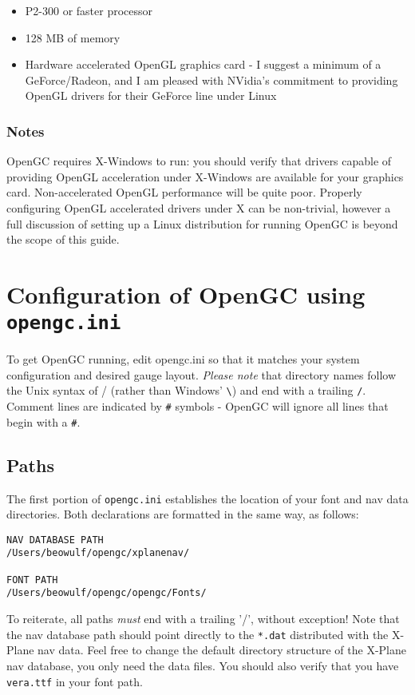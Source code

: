 \documentclass[11pt]{article}
\begin{document}
\begin{itemize}
\item P2-300 or faster processor
\item 128 MB of memory
\item Hardware accelerated OpenGL graphics card - I suggest a minimum of a GeForce/Radeon, and I am pleased with NVidia's commitment to providing OpenGL drivers for their GeForce line under Linux
\end{itemize}

\subsubsection{Notes}

OpenGC requires X-Windows to run: you should verify that drivers capable of providing OpenGL acceleration under X-Windows are available for your graphics card. Non-accelerated OpenGL performance will be quite poor. Properly configuring OpenGL accelerated drivers under X can be non-trivial, however a full discussion of setting up a Linux distribution for running OpenGC is beyond the scope of this guide.

\section{Configuration of OpenGC using \texttt{opengc.ini}}

To get OpenGC running, edit opengc.ini so that it matches your system configuration and desired gauge layout. \emph{Please note} that directory names follow the Unix syntax of / (rather than Windows' \verb+\+) and end with a trailing \texttt{/}. Comment lines are indicated by \texttt{\#} symbols - OpenGC will ignore all lines that begin with a \texttt{\#}.

\subsection{Paths}

The first portion of \texttt{opengc.ini} establishes the location of your font and nav data directories. Both declarations are formatted in the same way, as follows:

\begin{verbatim}
NAV DATABASE PATH
/Users/beowulf/opengc/xplanenav/

FONT PATH
/Users/beowulf/opengc/opengc/Fonts/
\end{verbatim}

\noindent To reiterate, all paths \emph{must} end with a trailing '/', without exception! Note that the nav database path should point directly to the \texttt{*.dat} distributed with the X-Plane nav data. Feel free to change the default directory structure of the X-Plane nav database, you only need the data files. You should also verify that you have \texttt{vera.ttf} in your font path.
\end{document}
